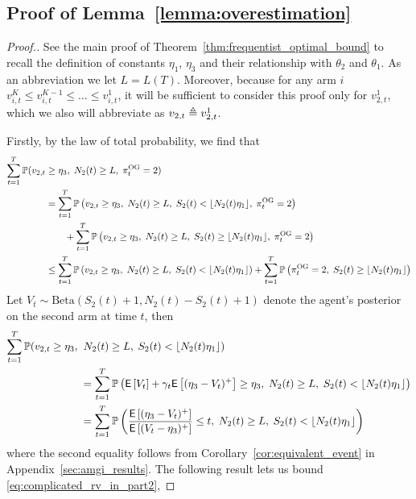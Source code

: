 \subsection{Proof of Lemma~\ref{lemma:overestimation}} \label{proof:overestimation_proof}

\begin{proof}[Proof.]
	See the main proof of Theorem~\ref{thm:frequentist_optimal_bound} to recall the definition of constants $\eta_1$, $\eta_3$ and their relationship with $\theta_2$ and $\theta_1$. As an abbreviation we let $L = L(T)$. Moreover, because for any arm $i$ $v^K_{i,t} \le v^{K-1}_{i,t} \le \ldots \le v^1_{i,t}$, it will be sufficient to consider this proof only for $v^1_{2,t}$, which we also will abbreviate as $v_{2,t} \triangleq v^1_{2,t}$.
	
	Firstly, by the law of total probability, we find that
	\begin{align} 
	\sum_{t=1}^T \mathbb{P}(v_{2,t} & \ge \eta_3 ,\; N_2(t) \ge L,\; \pi^{\rm OG}_t = 2) \nonumber \\
	& = \sum_{t=1}^T \mathbb{P} \left( v_{2,t} \ge \eta_3 ,\; N_2(t) \ge L, \; S_2(t) < \lfloor N_2(t) \eta_1\rfloor, \; \pi^{\rm OG}_t = 2 \right) \nonumber \\
	& \qquad + \sum_{t=1}^T \mathbb{P} \left( v_{2,t} \ge \eta_3 ,\; N_2(t) \ge L, \; S_2(t) \ge \lfloor N_2(t) \eta_1\rfloor,\; \pi^{\rm OG}_t = 2 \right) \nonumber \\
	& \le \sum_{t=1}^T \mathbb{P} \left( v_{2,t} \ge \eta_3 ,\; N_2(t) \ge L, \; S_2(t) < \lfloor N_2(t) \eta_1\rfloor \right) + \sum_{t=1}^T \mathbb{P} \left( \pi^{\rm OG}_t = 2,\; S_2(t) \ge \lfloor N_2(t) \eta_1\rfloor \right) \label{eqn:splitting_not_underestimate}
	\end{align}
	Let $V_t \sim \text{Beta}(S_2(t) + 1, N_2(t)- S_2(t) + 1)$ denote the agent's posterior on the second arm at time $t$, then
	\begin{align}
	\sum_{t=1}^T \mathbb{P}(v_{2,t} \ge \eta_3 ,\; & \; N_2(t) \ge L,\; S_2(t) < \lfloor N_2(t) \eta_1\rfloor)  \nonumber\\
	& = \sum_{t=1}^T \mathbb{P} \left( \mathsf{E} \left[ V_t \right] + \gamma_t \mathsf{E} \left[ (\eta_3 - V_t)^+ \right] \ge \eta_3, \; N_2(t) \ge L,\; S_2(t) < \lfloor N_2(t) \eta_1\rfloor \right) \nonumber \\
	& = \sum_{t=1}^T \mathbb{P} \left( \frac{\mathsf{E} \left[ (\eta_3-V_t)^+  \right]}{  \mathsf{E} \left[ (V_t - \eta_3)^+  \right]} \le t , \; N_2(t) \ge L,\; S_2(t) < \lfloor N_2(t) \eta_1\rfloor \right) \label{eq:complicated_rv_in_part2}
	\end{align}
	where the second equality follows from Corollary~\ref{cor:equivalent_event} in Appendix~\ref{sec:amgi_results}. The following result lets us bound \eqref{eq:complicated_rv_in_part2},

\end{proof}

